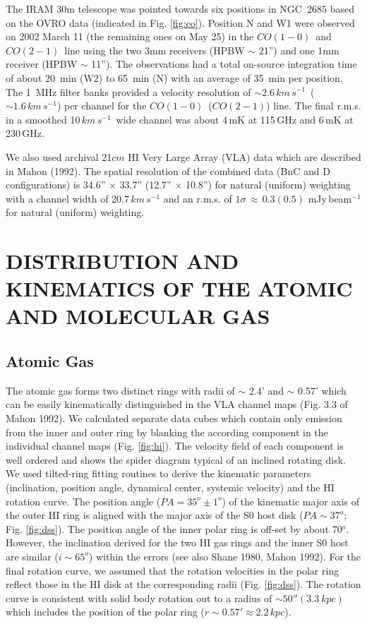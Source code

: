 \documentclass{aastex}
\newcommand{\COe}{$CO(1-0)$}
\newcommand{\COz}{$CO(2-1)$}
\newcommand{\kms}{km\,s^{-1}}
\begin{document}
The IRAM 30m telescope was pointed towards six positions in NGC~2685
based on the OVRO data (indicated in Fig. \ref{fig:co}). Position N
and W1 were observed on 2002 March 11 (the remaining ones on May 25)
in the \COe\, and \COz\, line using the two 3mm receivers (HPBW $\sim$
21'') and one 1mm receiver (HPBW $\sim$ 11''). The observations had a
total on-source integration time of about 20~min (W2) to 65~min (N)
with an average of 35~min per position. The 1~MHz filter banks
provided a velocity resolution of $\sim 2.6\,\kms$\ ($\sim 1.6\,\kms$)
per channel for the
\COe\, (\COz) line.  The final r.m.s. in a smoothed 10\,$\kms$\ wide
channel was about 4\,mK at 115\,GHz and 6\,mK at 230\,GHz.

We also used archival 21$cm$ HI Very Large Array (VLA) data which are
described in Mahon (1992). The spatial resolution of the combined data
(BnC and D configurations) is 34.6'' $\times$ 33.7'' (12.7'' $\times$
10.8'') for natural (uniform) weighting with a channel width of
20.7\,$\kms$ and an r.m.s.  of $1\sigma\,\approx\,0.3 (0.5)$
mJy\,beam$^{-1}$ for natural (uniform) weighting.

\section{DISTRIBUTION AND KINEMATICS OF THE ATOMIC AND MOLECULAR GAS}

\subsection{Atomic Gas}

The atomic gas forms two distinct rings with radii of $\sim$ 2.4' and
$\sim$ 0.57' which can be easily kinematically distinguished in the
VLA channel maps (Fig. 3.3 of Mahon 1992). We calculated separate data
cubes which contain only emission from the inner and outer ring by
blanking the according component in the individual channel maps
(Fig. \ref{fig:hi}). The velocity field of each component is well
ordered and shows the spider diagram typical of an inclined rotating
disk. We used tilted-ring fitting routines to derive the kinematic
parameters (inclination, position angle, dynamical center, systemic
velocity) and the HI rotation curve.  The position angle
($PA=35^o\pm1^o$) of the kinematic major axis of the outer HI ring is
aligned with the major axis of the S0 host disk ($PA \sim 37^o$;
Fig. \ref{fig:dss}). The position angle of the inner polar ring is
off-set by about 70$^o$. However, the inclination derived for the two
HI gas rings and the inner S0 host are similar ($i
\sim 65^o$) within the errors (see also Shane 1980, Mahon 1992).  For
the final rotation curve, we assumed that the rotation velocities in
the polar ring reflect those in the HI disk at the corresponding radii
(Fig. \ref{fig:dss}). The rotation curve is consistent with solid body
rotation out to a radius of $\sim 50'' (3.3~kpc)$ which includes the
position of the polar ring ($r\sim0.57'\approx 2.2\,kpc$).
\end{document}
